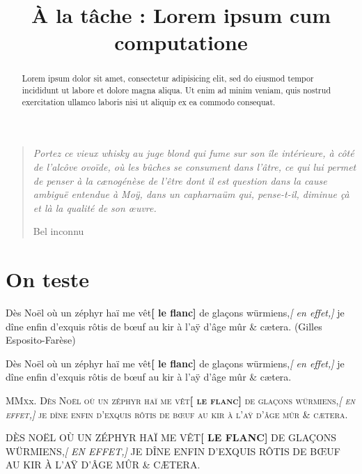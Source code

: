 \documentclass[a4paper,twoside,10pt,english,french]{article}   %
\title{À la tâche : Lorem ipsum cum computatione}
\author{Nicolas Potvin~\thanks\thethanks}
\date{\DTMToday}
\theoremstyle{definition}
\theoremstyle{remark}
\theoremstyle{plain}
\newcounter{quest}
\begin{document}
%
\let\oldproofname=\proofname
\renewcommand{\proofname}{\bfseries\oldproofname}
\renewcommand{\listfigurename}{Liste des schémas}
\renewcommand{\listtablename}{Liste des tables}
\renewcommand{\lstlistingname}{Programme}
\renewcommand{\lstlistlistingname}{Liste des programmes}
%
\maketitle
%
\begin{abstract}
Lorem ipsum dolor sit amet, consectetur adipisicing elit, sed do eiusmod tempor incididunt ut labore et dolore magna aliqua. Ut enim ad minim veniam, quis nostrud exercitation ullamco laboris nisi ut aliquip ex ea commodo consequat.
\end{abstract}

\blockquote[Bel inconnu]{\sl Portez ce vieux whisky au juge blond qui fume sur son île intérieure, à côté de l’alcôve ovoïde, où les bûches se consument dans l’âtre, ce qui lui permet de penser à la cænogénèse de l’être dont il est question dans la cause ambiguë entendue à Moÿ, dans un capharnaüm qui, pense-t-il, diminue çà et là la qualité de son œuvre.}

\section{On teste}

Dès Noël où un zéphyr haï me vêt\textbf{[ le flanc]} de glaçons würmiens,\textit{[ en effet,]} je dîne enfin d'exquis rôtis de bœuf au kir à l'aÿ d'âge mûr \& cætera. (Gilles Esposito-Farèse)

\textrm{Dès Noël où un zéphyr haï me vêt\textbf{[ le flanc]} de glaçons würmiens,\textit{[ en effet,]} je dîne enfin d'exquis rôtis de bœuf au kir à l'aÿ d'âge mûr \& cætera.}

M\textsc{Mx}x. \textsc{Dès Noël où un zéphyr haï me vêt\textbf{[ le flanc]} de glaçons würmiens,\textit{[ en effet,]} je dîne enfin d'exquis rôtis de bœuf au kir à l'aÿ d'âge mûr \& cætera.}

DÈS NOËL OÙ UN ZÉPHYR HAÏ ME VÊT\textbf{[ LE FLANC]} DE GLAÇONS WÜRMIENS,\textit{[ EN EFFET,]} JE DÎNE ENFIN D'EXQUIS RÔTIS DE BŒUF AU KIR À L'AŸ D'ÂGE MÛR \& CÆTERA.
\end{document}
